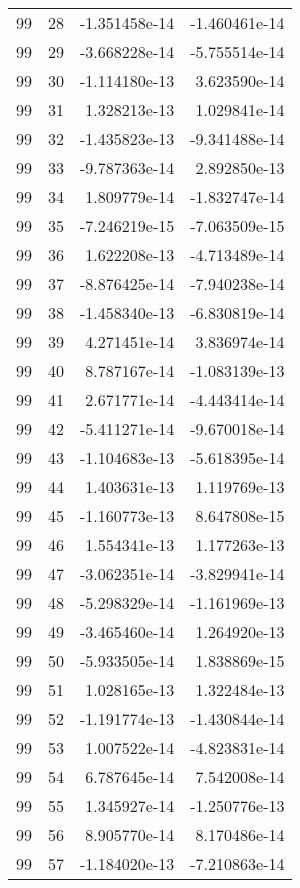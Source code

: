 \begin{tabular}{rrrr}
  99 &   28 & -1.351458e-14 & -1.460461e-14 \\
  99 &   29 & -3.668228e-14 & -5.755514e-14 \\
  99 &   30 & -1.114180e-13 &  3.623590e-14 \\
  99 &   31 &  1.328213e-13 &  1.029841e-14 \\
  99 &   32 & -1.435823e-13 & -9.341488e-14 \\
  99 &   33 & -9.787363e-14 &  2.892850e-13 \\
  99 &   34 &  1.809779e-14 & -1.832747e-14 \\
  99 &   35 & -7.246219e-15 & -7.063509e-15 \\
  99 &   36 &  1.622208e-13 & -4.713489e-14 \\
  99 &   37 & -8.876425e-14 & -7.940238e-14 \\
  99 &   38 & -1.458340e-13 & -6.830819e-14 \\
  99 &   39 &  4.271451e-14 &  3.836974e-14 \\
  99 &   40 &  8.787167e-14 & -1.083139e-13 \\
  99 &   41 &  2.671771e-14 & -4.443414e-14 \\
  99 &   42 & -5.411271e-14 & -9.670018e-14 \\
  99 &   43 & -1.104683e-13 & -5.618395e-14 \\
  99 &   44 &  1.403631e-13 &  1.119769e-13 \\
  99 &   45 & -1.160773e-13 &  8.647808e-15 \\
  99 &   46 &  1.554341e-13 &  1.177263e-13 \\
  99 &   47 & -3.062351e-14 & -3.829941e-14 \\
  99 &   48 & -5.298329e-14 & -1.161969e-13 \\
  99 &   49 & -3.465460e-14 &  1.264920e-13 \\
  99 &   50 & -5.933505e-14 &  1.838869e-15 \\
  99 &   51 &  1.028165e-13 &  1.322484e-13 \\
  99 &   52 & -1.191774e-13 & -1.430844e-14 \\
  99 &   53 &  1.007522e-14 & -4.823831e-14 \\
  99 &   54 &  6.787645e-14 &  7.542008e-14 \\
  99 &   55 &  1.345927e-14 & -1.250776e-13 \\
  99 &   56 &  8.905770e-14 &  8.170486e-14 \\
  99 &   57 & -1.184020e-13 & -7.210863e-14 \\

\end{tabular}
